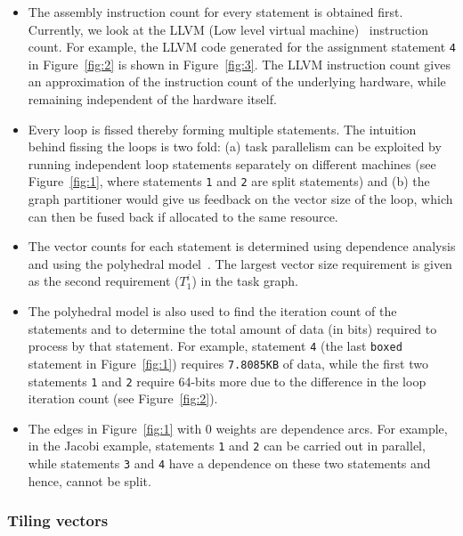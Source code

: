 \begin{itemize}

\item The assembly instruction count for every statement is obtained
  first. Currently, we look at the LLVM (Low level virtual
  machine)~\cite{clat04} instruction count. For example, the LLVM code
  generated for the assignment statement \texttt{4} in
  Figure~\ref{fig:2} is shown in Figure~\ref{fig:3}. The LLVM
  instruction count gives an approximation of the instruction count of
  the underlying hardware, while remaining independent of the hardware
  itself.

\item Every loop is fissed thereby forming multiple statements. The
  intuition behind fissing the loops is two fold: (a) task parallelism
  can be exploited by running independent loop statements separately on
  different machines (see Figure~\ref{fig:1}, where statements
  \texttt{1} and \texttt{2} are split statements) and (b) the graph
  partitioner would give us feedback on the vector size of the loop,
  which can then be fused back if allocated to the same resource.

\item The vector counts for each statement is determined using
  dependence analysis and using the polyhedral model~\cite{mgri98}. The
  largest vector size requirement is given as the second requirement
  ($T^i_1$) in the task graph.

\item The polyhedral model is also used to find the iteration count of
  the statements and to determine the total amount of data (in bits)
  required to process by that statement. For example, statement
  \texttt{4} (the last \texttt{boxed} statement in Figure~\ref{fig:1})
  requires \texttt{7.8085KB} of data, while the first two statements
  \texttt{1} and \texttt{2} require 64-bits more due to the difference
  in the loop iteration count (see Figure~\ref{fig:2}).

\item The edges in Figure~\ref{fig:1} with 0 weights are dependence
  arcs. For example, in the Jacobi example, statements \texttt{1} and
  \texttt{2} can be carried out in parallel, while statements
  \texttt{3} and \texttt{4} have a dependence on these two statements
  and hence, cannot be split.

\end{itemize}

\subsubsection{Tiling vectors}
\label{sec:tiling-vector-counts}

